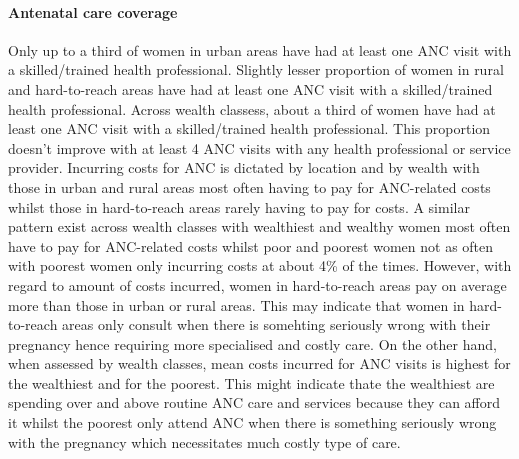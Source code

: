 \documentclass[12pt,a4paper]{article}
\let\oldparagraph\paragraph
\renewcommand{\paragraph}[1]{\oldparagraph{#1}\mbox{}}
\begin{document}
\hypertarget{ancCoverage}{%
\paragraph{Antenatal care coverage}\label{ancCoverage}}

Only up to a third of women in urban areas have had at least one ANC visit with a skilled/trained health professional. Slightly lesser proportion of women in rural and hard-to-reach areas have had at least one ANC visit with a skilled/trained health professional. Across wealth classess, about a third of women have had at least one ANC visit with a skilled/trained health professional. This proportion doesn't improve with at least 4 ANC visits with any health professional or service provider. Incurring costs for ANC is dictated by location and by wealth with those in urban and rural areas most often having to pay for ANC-related costs whilst those in hard-to-reach areas rarely having to pay for costs. A similar pattern exist across wealth classes with wealthiest and wealthy women most often have to pay for ANC-related costs whilst poor and poorest women not as often with poorest women only incurring costs at about 4\% of the times. However, with regard to amount of costs incurred, women in hard-to-reach areas pay on average more than those in urban or rural areas. This may indicate that women in hard-to-reach areas only consult when there is somehting seriously wrong with their pregnancy hence requiring more specialised and costly care. On the other hand, when assessed by wealth classes, mean costs incurred for ANC visits is highest for the wealthiest and for the poorest. This might indicate thate the wealthiest are spending over and above routine ANC care and services because they can afford it whilst the poorest only attend ANC when there is something seriously wrong with the pregnancy which necessitates much costly type of care.
\end{document}
